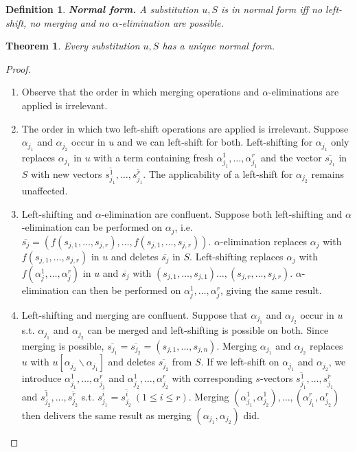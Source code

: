 \documentclass[a4paper, 11pt]{report}
\newtheorem{theorem}{Theorem}
\newtheorem{definition}{Definition}
\begin{document}
\begin{definition} \textbf{Normal form.} A substitution $u,S$ is in normal form iff no left-shift, no merging and no $\alpha$-elimination are possible.
\end{definition}

\begin{theorem}Every substitution $u,S$ has a unique normal form. \label{thm:uniqueNormalForm}\end{theorem}

\begin{proof}
  \begin{enumerate}
    \item Observe that the order in which merging operations and $\alpha$-eliminations are applied is irrelevant. 
    \item The order in which two left-shift operations are applied is irrelevant. Suppose $\alpha_{j_1}$ and $\alpha_{j_2}$ occur in $u$ and
          we can left-shift for both. Left-shifting for $\alpha_{j_1}$ only replaces $\alpha_{j_1}$ in $u$ with a term containing fresh
          $\alpha_{j_1}^1,\dots,\alpha_{j_1}^r$ and the vector $\overline{s_{j_1}}$ in $S$ with new vectors $\overline{s_{j_1}^1},\dots,\overline{s_{j_1}^r}$.
          The applicability of a left-shift for $\alpha_{j_2}$ remains unaffected.
    \item Left-shifting and $\alpha$-elimination are confluent.
          Suppose both left-shifting and $\alpha$-elimination can be performed on $\alpha_j$, i.e.\\
          $\overline{s_j} = (f(s_{j,1},\dots,s_{j,r}),\dots,f(s_{j,1},\dots,s_{j,r}))$.
          $\alpha$-elimination replaces $\alpha_j$ with $f(s_{j,1},\dots,s_{j,r})$ in $u$ and deletes $\overline{s_j}$ in $S$.
          Left-shifting replaces $\alpha_j$ with $f(\alpha_j^1,\dots,\alpha_j^r)$ in $u$ and $\overline{s_j}$ with $(s_{j,1},\dots,s_{j,1})\dots,(s_{j,r},\dots,s_{j,r})$.
          $\alpha$-elimination can then be performed on $\alpha_j^1,\dots,\alpha_j^r$, giving the same result.
    \item Left-shifting and merging are confluent. Suppose that $\alpha_{j_1}$ and $\alpha_{j_2}$ occur in $u$ s.t. $\alpha_{j_1}$ and $\alpha_{j_2}$
          can be merged and left-shifting is possible on both.
          Since merging is possible, $\overline{s_{j_1}} = \overline{s_{j_2}} = (s_{j,1},\dots,s_{j,n})$. Merging $\alpha_{j_1}$ and $\alpha_{j_2}$ replaces $u$
          with $u[\alpha_{j_2}\backslash \alpha_{j_1}]$ and deletes $\overline{s_{j_2}}$ from $S$.
          If we left-shift on $\alpha_{j_1}$ and $\alpha_{j_2}$, we introduce $\alpha_{j_1}^1,\dots,\alpha_{j_1}^r$ and $\alpha_{j_2}^1,\dots,\alpha_{j_2}^r$
          with corresponding $s$-vectors $\overline{s_{j_1}^1},\dots,\overline{s_{j_1}^r}$ and $\overline{s_{j_2}^1},\dots,\overline{s_{j_2}^r}$
          s.t. $\overline{s_{j_1}^i} = \overline{s_{j_2}^i}\ (1 \leq i \leq r)$.
          Merging $(\alpha_{j_1}^1, \alpha_{j_2}^1), \dots, (\alpha_{j_1}^r, \alpha_{j_2}^r)$ then delivers the same result as merging $(\alpha_{j_1},\alpha_{j_2})$ did. 
  \end{enumerate}
\end{proof}
\end{document}
